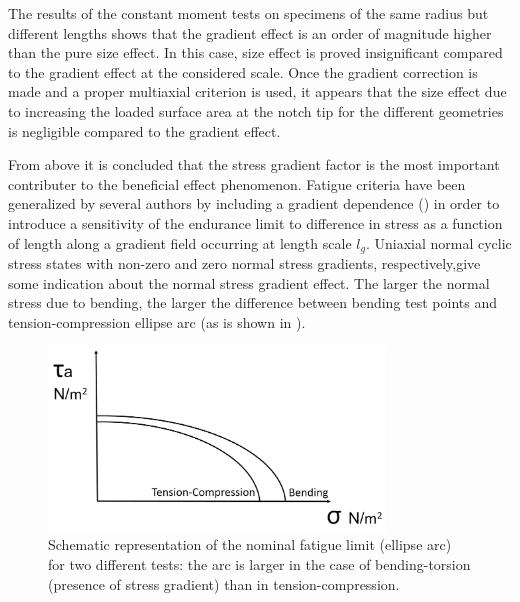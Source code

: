 The results of the constant moment tests on specimens of the same radius but different lengths shows that the gradient effect is an order of magnitude higher than the pure size effect. In this case, size effect is proved insignificant compared to the gradient effect at the considered scale. Once the gradient correction is made and a proper multiaxial criterion is used, it appears that the size effect due to increasing the loaded surface area at the notch tip for the different geometries is negligible compared to the gradient effect.

From above it is concluded that the stress gradient factor is the most important contributer to the beneficial effect phenomenon. Fatigue criteria have been generalized by several authors by including a  gradient dependence (\cite{Papadopoulos1996513}) in order to introduce a sensitivity of the endurance limit to difference in stress as a function of length along a gradient field occurring at length scale  $l_g$. Uniaxial normal cyclic stress states with non-zero and zero normal stress gradients, respectively,give some indication about the normal stress gradient effect. The larger the normal stress due to bending, the larger the difference between bending test points and tension-compression ellipse arc (as is shown in ).
\begin{figure}[!h]
	\centering
	\includegraphics[width=0.8\textwidth]{figures//fig2.jpg} 
	\caption{Schematic representation of the nominal fatigue limit (ellipse arc) for two different tests: the arc is larger in the case of bending-torsion (presence of stress gradient) than in tension-compression.}
	\label{fig2}
\end{figure}


